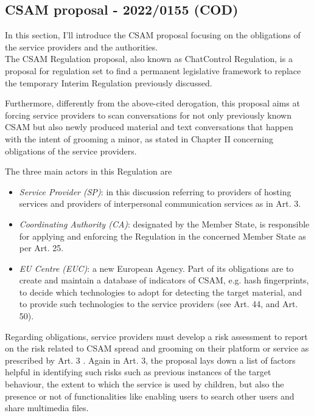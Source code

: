\subsection{CSAM proposal - 2022/0155 (COD)}

In this section, I'll introduce the CSAM proposal focusing on the obligations of the service providers and the authorities. \\

The CSAM Regulation proposal, also known as ChatControl Regulation, is a proposal for regulation set to find a permanent legislative framework to replace the temporary Interim Regulation previously discussed. 

Furthermore, differently from the above-cited derogation, this proposal aims at forcing service providers to scan conversations for not only previously known CSAM but also newly produced material and text conversations that happen with the intent of grooming a minor, as stated in Chapter II concerning obligations of the service providers\cite{eu2023chatcontrol}.

The three main actors in this Regulation are

\begin{itemize}
    \item \textit{Service Provider (SP)}: in this discussion referring to providers of hosting services and providers of interpersonal communication services as in Art. 3.
    \item \textit{Coordinating Authority (CA)}: designated by the Member State, is responsible for applying and enforcing the Regulation in the concerned Member State as per Art. 25.
    \item \textit{EU Centre (EUC)}: a new European Agency. Part of its obligations are to create and maintain a database of indicators of CSAM, e.g. hash fingerprints, to decide which technologies to adopt for detecting the target material, and to provide such technologies to the service providers (see Art. 44, and Art. 50).
\end{itemize}

Regarding obligations, service providers must develop a risk assessment to report on the risk related to CSAM spread and grooming on their platform or service as prescribed by Art. 3 \cite{eu2023chatcontrol}. 
Again in Art. 3, the proposal lays down a list of factors helpful in identifying such risks such as previous instances of the target behaviour, the extent to which the service is used by children, but also the presence or not of functionalities like enabling users to search other users and share multimedia files.

